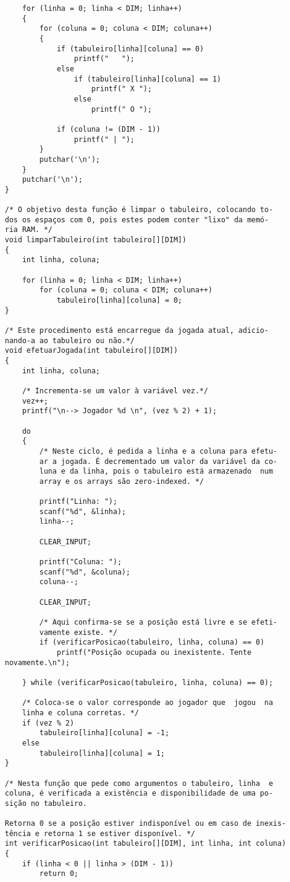 \begin{lstlisting}
	for (linha = 0; linha < DIM; linha++)
	{
		for (coluna = 0; coluna < DIM; coluna++)
		{
			if (tabuleiro[linha][coluna] == 0)
				printf("   ");
			else
				if (tabuleiro[linha][coluna] == 1)
					printf(" X ");
				else
					printf(" O ");

			if (coluna != (DIM - 1))
				printf(" | ");
		}
		putchar('\n');
	}
	putchar('\n');
}

/* O objetivo desta função é limpar o tabuleiro, colocando to-
dos os espaços com 0, pois estes podem conter "lixo" da memó-
ria RAM. */
void limparTabuleiro(int tabuleiro[][DIM])
{
	int linha, coluna;

	for (linha = 0; linha < DIM; linha++)
		for (coluna = 0; coluna < DIM; coluna++)
			tabuleiro[linha][coluna] = 0;
}

/* Este procedimento está encarregue da jogada atual, adicio-
nando-a ao tabuleiro ou não.*/
void efetuarJogada(int tabuleiro[][DIM])
{
	int linha, coluna;

	/* Incrementa-se um valor à variável vez.*/
	vez++;
	printf("\n--> Jogador %d \n", (vez % 2) + 1);

	do
	{
		/* Neste ciclo, é pedida a linha e a coluna para efetu-
		ar a jogada. É decrementado um valor da variável da co-
		luna e da linha, pois o tabuleiro está armazenado  num
		array e os arrays são zero-indexed. */

		printf("Linha: ");
		scanf("%d", &linha);
		linha--;

		CLEAR_INPUT;

		printf("Coluna: ");
		scanf("%d", &coluna);
		coluna--;

		CLEAR_INPUT;

		/* Aqui confirma-se se a posição está livre e se efeti-
		vamente existe. */
		if (verificarPosicao(tabuleiro, linha, coluna) == 0)
			printf("Posição ocupada ou inexistente. Tente novamente.\n");

	} while (verificarPosicao(tabuleiro, linha, coluna) == 0);

	/* Coloca-se o valor corresponde ao jogador que  jogou  na
	linha e coluna corretas. */
	if (vez % 2)
		tabuleiro[linha][coluna] = -1;
	else
		tabuleiro[linha][coluna] = 1;
}

/* Nesta função que pede como argumentos o tabuleiro, linha  e
coluna, é verificada a existência e disponibilidade de uma po-
sição no tabuleiro.

Retorna 0 se a posição estiver indisponível ou em caso de inexis-
tência e retorna 1 se estiver disponível. */
int verificarPosicao(int tabuleiro[][DIM], int linha, int coluna)
{
	if (linha < 0 || linha > (DIM - 1))
		return 0;


\end{lstlisting}
